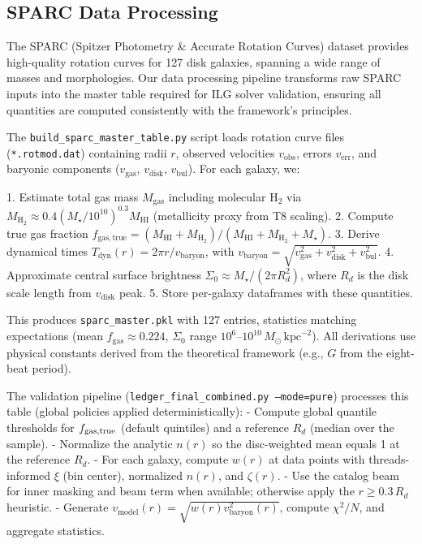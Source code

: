 \documentclass[12pt,a4paper]{article}
\begin{document}
\subsection{SPARC Data Processing}

The SPARC (Spitzer Photometry \& Accurate Rotation Curves) dataset provides high-quality rotation curves for 127 disk galaxies, spanning a wide range of masses and morphologies. Our data processing pipeline transforms raw SPARC inputs into the master table required for ILG solver validation, ensuring all quantities are computed consistently with the framework's principles.

The \texttt{build\_sparc\_master\_table.py} script loads rotation curve files (\texttt{*.rotmod.dat}) containing radii $r$, observed velocities $v_\mathrm{obs}$, errors $v_\mathrm{err}$, and baryonic components ($v_\mathrm{gas}$, $v_\mathrm{disk}$, $v_\mathrm{bul}$). For each galaxy, we:

1. Estimate total gas mass $M_\mathrm{gas}$ including molecular H$_2$ via $M_\mathrm{H_2} \approx 0.4 (M_\star / 10^{10})^{0.3} M_\mathrm{HI}$ (metallicity proxy from T8 scaling).
2. Compute true gas fraction $f_\mathrm{gas,true} = (M_\mathrm{HI} + M_\mathrm{H_2}) / (M_\mathrm{HI} + M_\mathrm{H_2} + M_\star)$.
3. Derive dynamical times $T_\mathrm{dyn}(r) = 2\pi r / v_\mathrm{baryon}$, with $v_\mathrm{baryon} = \sqrt{v_\mathrm{gas}^2 + v_\mathrm{disk}^2 + v_\mathrm{bul}^2}$.
4. Approximate central surface brightness $\Sigma_0 \approx M_\star / (2\pi R_d^2)$, where $R_d$ is the disk scale length from $v_\mathrm{disk}$ peak.
5. Store per-galaxy dataframes with these quantities.

This produces \texttt{sparc\_master.pkl} with 127 entries, statistics matching expectations (mean $f_\mathrm{gas} \approx 0.224$, $\Sigma_0$ range $10^6$--$10^{10}\,M_\odot\,\mathrm{kpc}^{-2}$). All derivations use physical constants derived from the theoretical framework (e.g., $G$ from the eight-beat period).

The validation pipeline (\texttt{ledger\_final\_combined.py --mode=pure}) processes this table (global policies applied deterministically):
- Compute global quantile thresholds for $f_{\rm gas,true}$ (default quintiles) and a reference $R_d$ (median over the sample).
- Normalize the analytic $n(r)$ so the disc-weighted mean equals 1 at the reference $R_d$.
- For each galaxy, compute $w(r)$ at data points with threads-informed $\xi$ (bin center), normalized $n(r)$, and $\zeta(r)$.
- Use the catalog beam for inner masking and beam term when available; otherwise apply the $r\ge0.3\,R_d$ heuristic.
- Generate $v_\mathrm{model}(r) = \sqrt{w(r) v_\mathrm{baryon}^2(r)}$, compute $\chi^2/N$, and aggregate statistics.
\end{document}
